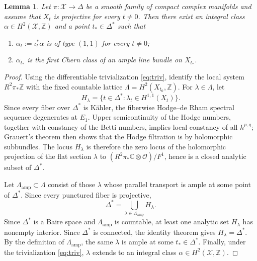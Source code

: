 \documentclass[11pt,letterpaper]{amsart}
\numberwithin{equation}{section}
\newcommand{\CC}{\mathbb{C}}
\newcommand{\ZZ}{\mathbb{Z}}
\newcommand{\cal}{\mathcal}
\def\cX{{\cal X}}
\newtheorem{lemm}[prop]{Lemma}
\begin{document}
\begin{lemm}\label{lem:persistent-integral}
Let $\pi:\cX\to\Delta$ be a smooth family of compact complex manifolds and
assume that $X_t$ is projective for every $t\ne0$. Then there exist an integral
class $\alpha\in H^2(\cX,\ZZ)$ and a point $t_*\in\Delta^*$ such that
\begin{enumerate}
\item $\alpha_t:=\iota_t^*\alpha$ is of type $(1,1)$ for every $t\ne0$;
\item $\alpha_{t_*}$ is the first Chern class of an ample line bundle on
$X_{t_*}$.
\end{enumerate}
\end{lemm}
\begin{proof}
Using the differentiable trivialization \eqref{eq:triv}, identify the local system $R^2\pi_*\ZZ$ with the fixed countable lattice
$\Lambda=H^2(X_{t_0},\ZZ)$. For $\lambda\in\Lambda$, let
\[
 H_\lambda=\{t\in\Delta^*: \lambda_t\in H^{1,1}(X_t)\}.
\]
Since every fiber over $\Delta^*$ is K\"ahler, the fiberwise Hodge--de Rham
spectral sequence degenerates at $E_1$. Upper semicontinuity of the Hodge numbers, together with constancy of the Betti numbers, implies local constancy of all $h^{p,q}$; Grauert's theorem then shows that the Hodge filtration is by
holomorphic subbundles. The locus $H_\lambda$ is therefore the zero locus
of the holomorphic projection of the flat section $\lambda$ to
$(R^2\pi_*\CC\otimes\mathcal O)/F^1$, hence is a closed analytic subset of
$\Delta^*$.

Let $\Lambda_{\mathrm{amp}}\subset\Lambda$ consist of those $\lambda$ whose parallel transport is ample at some point of $\Delta^*$. Since every punctured
fiber is projective,
\[
 \Delta^*=\bigcup_{\lambda\in\Lambda_{\mathrm{amp}}}H_\lambda.
\]
Since $\Delta^*$ is a Baire space and $\Lambda_{\mathrm{amp}}$ is countable, at least one analytic set $H_\lambda$ has nonempty interior. Since
$\Delta^*$ is connected, the identity theorem gives
$H_\lambda=\Delta^*$. By the definition of $\Lambda_{\mathrm{amp}}$, the
same $\lambda$ is ample at some $t_*\in\Delta^*$. Finally, under the trivialization \eqref{eq:triv}, $\lambda$ extends to an integral class
$\alpha\in H^2(\cX,\ZZ)$.
\end{proof}
\end{document}
